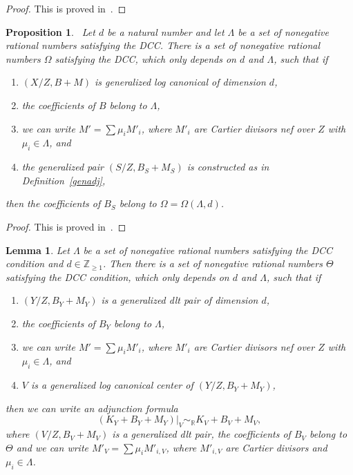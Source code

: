 \documentclass{amsart}
\newcommand{\rr}{\mathbb{R}}
\newtheorem{lemma}[theorem]{Lemma}
\newtheorem{proposition}[theorem]{Proposition}
\theoremstyle{remark}
\numberwithin{equation}{section}
\begin{document}
\begin{proof}
This is proved in~\cite[Remark 4.8]{BZ16}.
\end{proof}

\vspace{0.05cm}

\begin{proposition}~\label{divadj}
Let $d$ be a natural number and let $\Lambda$ be a set of nonegative rational numbers satisfying the DCC.
There is a set of nonegative rational numbers $\Omega$ satisfying the DCC, which only depends on $d$ and $\Lambda$,
such that if 
\begin{enumerate}
\item $(X/Z,B+M)$ is generalized log canonical of dimension $d$, 
\item the coefficients of $B$ belong to $\Lambda$,
\item we can write $M'=\sum \mu_i M'_i$, where $M'_i$ are Cartier divisors nef over $Z$ with $\mu_i \in \Lambda$, and
\item the generalized pair $(S/Z,B_S+M_S)$ is constructed as in Definition~\ref{genadj},
\end{enumerate}
then the coefficients of $B_S$ belong to $\Omega=\Omega (\Lambda, d)$.
\end{proposition}

\begin{proof}
This is proved in~\cite[Proposition 4.9]{BZ16}.
\end{proof}

\begin{lemma}\label{adjunction}
Let $\Lambda$ be a set of nonegative rational numbers satisfying the DCC condition and $d \in \mathbb{Z}_{\geq 1}$.
Then there is a set of nonegative rational numbers $\Theta$ satisfying the DCC condition, 
which only depends on $d$ and $\Lambda$, such that if 
\begin{enumerate}
\item $(Y/Z,B_Y+M_Y)$ is a generalized dlt pair of dimension $d$,
\item the coefficients of $B_Y$ belong to $\Lambda$,
\item we can write $M'=\sum \mu_i M'_i$, where $M'_i$ are Cartier divisors nef over $Z$ with $\mu_i\in \Lambda$, and
\item $V$ is a generalized log canonical center of $(Y/Z,B_Y+M_Y)$,
\end{enumerate}
then we can write an adjunction formula
\[
(K_Y+B_Y+M_Y)|_V \sim_\rr K_V+B_V+M_V,
\]
where $(V/Z,B_V+M_V)$ is a generalized dlt pair, the coefficients of $B_V$ belong to $\Theta$
and we can write $M'_V=\sum \mu_i M'_{i,V}$, where $M'_{i,V}$ are Cartier divisors and $\mu_i\in \Lambda$.
\end{lemma}
\end{document}
